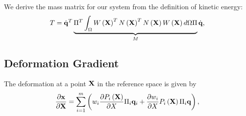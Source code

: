 We derive the mass matrix for our system from the definition of kinetic energy:
\begin{equation}
    T = \dot{\mathbf{q}}^T\underbrace{\Pi^T\int_{\Omega}W\left(\mathbf{X}\right)^TN\left(\mathbf{X}\right)^TN\left(\mathbf{X}\right)W\left(\mathbf{X}\right)d\Omega\Pi}_{M}\dot{\mathbf{q}},
\end{equation}


\subsection{Deformation Gradient}
The deformation at a point $\mathbf{X}$ in the reference space is given by
\begin{equation}
    \frac{\partial\mathbf{x}}{\partial \mathbf{X}} = \sum_{i=1}^m\left(w_i\frac{\partial P_i\left(\mathbf{X} \right)}{\partial X}\Pi_i\mathbf{q}_i + \frac{\partial w_i}{\partial X}P_i\left(\mathbf{X} \right)\Pi_i\mathbf{q}\right), 
\end{equation}

